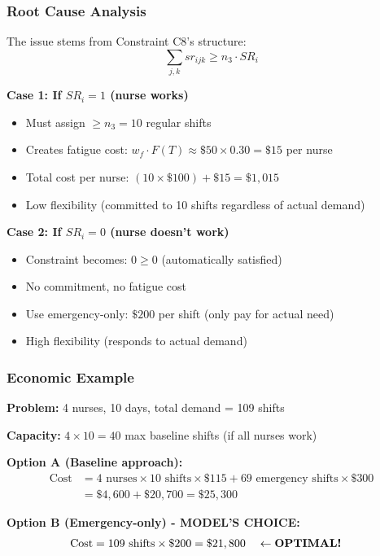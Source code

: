 \documentclass[11pt,letterpaper]{article}
\begin{document}
\subsubsection{Root Cause Analysis}
The issue stems from Constraint C8's structure:
\begin{equation}
\sum_{j,k} sr_{ijk} \geq n_3 \cdot SR_i
\end{equation}

\textbf{Case 1: If $SR_i = 1$ (nurse works)}
\begin{itemize}[leftmargin=*]
    \item Must assign $\geq n_3 = 10$ regular shifts
    \item Creates fatigue cost: $w_f \cdot F(T) \approx \$50 \times 0.30 = \$15$ per nurse
    \item Total cost per nurse: $(10 \times \$100) + \$15 = \$1,015$
    \item Low flexibility (committed to 10 shifts regardless of actual demand)
\end{itemize}

\textbf{Case 2: If $SR_i = 0$ (nurse doesn't work)}
\begin{itemize}[leftmargin=*]
    \item Constraint becomes: $0 \geq 0$ (automatically satisfied)
    \item No commitment, no fatigue cost
    \item Use emergency-only: $\$200$ per shift (only pay for actual need)
    \item High flexibility (responds to actual demand)
\end{itemize}

\subsubsection{Economic Example}
\textbf{Problem:} 4 nurses, 10 days, total demand = 109 shifts

\textbf{Capacity:} $4 \times 10 = 40$ max baseline shifts (if all nurses work)

\textbf{Option A (Baseline approach):}
\begin{align*}
\text{Cost} &= 4 \text{ nurses} \times 10 \text{ shifts} \times \$115 + 69 \text{ emergency shifts} \times \$300 \\
&= \$4,600 + \$20,700 = \$25,300
\end{align*}

\textbf{Option B (Emergency-only) - MODEL'S CHOICE:}
\begin{align*}
\text{Cost} &= 109 \text{ shifts} \times \$200 = \$21,800 \quad \leftarrow \text{\textbf{OPTIMAL!}}
\end{align*}
\end{document}
